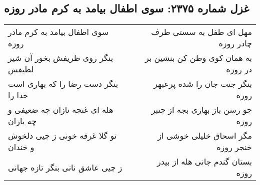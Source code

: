 \begin{center}
\section*{غزل شماره ۲۳۷۵: سوی اطفال بیامد به کرم مادر روزه}
\label{sec:2375}
\begin{longtable}{l p{0.5cm} r}
سوی اطفال بیامد به کرم مادر روزه
&&
مهل ای طفل به سستی طرف چادر روزه
\\
بنگر روی ظریفش بخور آن شیر لطیفش
&&
به همان کوی وطن کن بنشین بر در روزه
\\
بنگر دست رضا را که بهاری است خدا را
&&
بنگر جنت جان را شده پرعبهر روزه
\\
هله ای غنچه نازان چه ضعیفی و چه یازان
&&
چو رسن باز بهاری بجه از چنبر روزه
\\
تو گلا غرقه خونی ز چیی دلخوش و خندان
&&
مگر اسحاق خلیلی خوشی از خنجر روزه
\\
ز چیی عاشق نانی بنگر تازه جهانی
&&
بستان گندم جانی هله از بیدر روزه
\\
\end{longtable}
\end{center}
